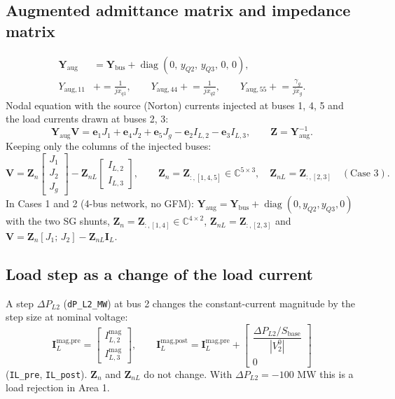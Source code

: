 \documentclass[11pt,a4paper]{article}
\numberwithin{equation}{section}
\begin{document}
\subsection{Augmented admittance matrix and impedance matrix}
\begin{align}
\bm Y_{\text{aug}} &= \bm Y_{\text{bus}} + \operatorname{diag}(0,\,y_{Q2},\,y_{Q3},\,0,\,0),\\
Y_{\text{aug},11} &\mathrel{+}= \frac{1}{jx_{q1}},\qquad Y_{\text{aug},44} \mathrel{+}= \frac{1}{jx_{q2}},\qquad Y_{\text{aug},55} \mathrel{+}= \frac{\gamma_g}{jx_g} .
\end{align}
Nodal equation with the source (Norton) currents injected at buses 1, 4, 5 and the load currents drawn at buses 2, 3:
\begin{equation}
\bm Y_{\text{aug}}\bm V = \bm e_1 J_1 + \bm e_4 J_2 + \bm e_5 J_g - \bm e_2 I_{L,2} - \bm e_3 I_{L,3},\qquad \bm Z = \bm Y_{\text{aug}}^{-1}.
\end{equation}
Keeping only the columns of the injected buses:
\begin{equation}
\boxed{\bm V = \bm Z_n \begin{bmatrix} J_1\\ J_2\\ J_g\end{bmatrix} - \bm Z_{nL}\begin{bmatrix} I_{L,2}\\ I_{L,3}\end{bmatrix},\qquad
\bm Z_n = \bm Z_{:,[1,4,5]}\in\mathbb C^{5\times 3},\quad \bm Z_{nL} = \bm Z_{:,[2,3]}\quad(\text{Case 3}).}
\end{equation}
In Cases 1 and 2 (4-bus network, no GFM): $\bm Y_{\text{aug}} = \bm Y_{\text{bus}} + \operatorname{diag}(0,y_{Q2},y_{Q3},0)$ with the two SG shunts, $\bm Z_n = \bm Z_{:,[1,4]}\in\mathbb C^{4\times 2}$, $\bm Z_{nL} = \bm Z_{:,[2,3]}$ and $\bm V = \bm Z_n[J_1;\,J_2] - \bm Z_{nL}\bm I_L$.

\subsection{Load step as a change of the load current}
A step $\Delta P_{L2}$ (\texttt{dP\_L2\_MW}) at bus 2 changes the constant-current magnitude by the step size at nominal voltage:
\begin{equation}
\bm I_L^{\text{mag,pre}} = \begin{bmatrix} I_{L,2}^{\text{mag}}\\ I_{L,3}^{\text{mag}}\end{bmatrix},\qquad
\bm I_L^{\text{mag,post}} = \bm I_L^{\text{mag,pre}} + \begin{bmatrix} \dfrac{\Delta P_{L2}/S_{\text{base}}}{|V_2^0|}\\ 0\end{bmatrix}
\end{equation}
(\texttt{IL\_pre}, \texttt{IL\_post}). $\bm Z_n$ and $\bm Z_{nL}$ do not change. With $\Delta P_{L2}=-100$ MW this is a load rejection in Area 1.
\end{document}
